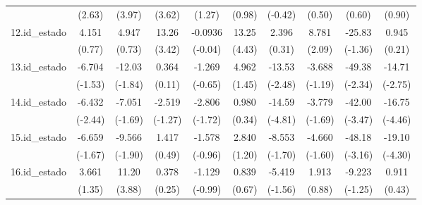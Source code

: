 {\begin{tabular}{l*{9}{c}}
            &      (2.63)         &      (3.97)         &      (3.62)         &      (1.27)         &      (0.98)         &     (-0.42)         &      (0.50)         &      (0.60)         &      (0.90)         \\
[1em]
12.id\_estado&       4.151         &       4.947         &       13.26\sym{***}&     -0.0936         &       13.25\sym{***}&       2.396         &       8.781\sym{*}  &      -25.83         &       0.945         \\
            &      (0.77)         &      (0.73)         &      (3.42)         &     (-0.04)         &      (4.43)         &      (0.31)         &      (2.09)         &     (-1.36)         &      (0.21)         \\
[1em]
13.id\_estado&      -6.704         &      -12.03         &       0.364         &      -1.269         &       4.962         &      -13.53\sym{*}  &      -3.688         &      -49.38\sym{*}  &      -14.71\sym{**} \\
            &     (-1.53)         &     (-1.84)         &      (0.11)         &     (-0.65)         &      (1.45)         &     (-2.48)         &     (-1.19)         &     (-2.34)         &     (-2.75)         \\
[1em]
14.id\_estado&      -6.432\sym{*}  &      -7.051         &      -2.519         &      -2.806         &       0.980         &      -14.59\sym{***}&      -3.779         &      -42.00\sym{***}&      -16.75\sym{***}\\
            &     (-2.44)         &     (-1.69)         &     (-1.27)         &     (-1.72)         &      (0.34)         &     (-4.81)         &     (-1.69)         &     (-3.47)         &     (-4.46)         \\
[1em]
15.id\_estado&      -6.659         &      -9.566         &       1.417         &      -1.578         &       2.840         &      -8.553         &      -4.660         &      -48.18\sym{**} &      -19.10\sym{***}\\
            &     (-1.67)         &     (-1.90)         &      (0.49)         &     (-0.96)         &      (1.20)         &     (-1.70)         &     (-1.60)         &     (-3.16)         &     (-4.30)         \\
[1em]
16.id\_estado&       3.661         &       11.20\sym{***}&       0.378         &      -1.129         &       0.839         &      -5.419         &       1.913         &      -9.223         &       0.911         \\
            &      (1.35)         &      (3.88)         &      (0.25)         &     (-0.99)         &      (0.67)         &     (-1.56)         &      (0.88)         &     (-1.25)         &      (0.43)         \\

\end{tabular}}
